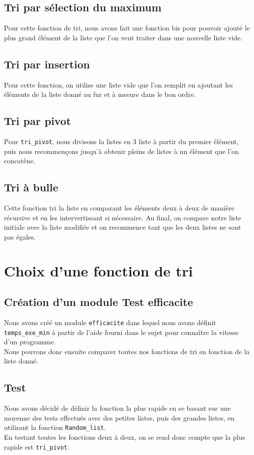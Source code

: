 \documentclass[a4paper, 11pt]{article}
\begin{document}
\subsection{Tri par sélection du maximum}
Pour cette fonction de tri, nous avons fait une fonction bis pour pouvoir ajouté le plus grand élément de la liste que l'on veut traiter dans une nouvelle liste vide.

\subsection{Tri par insertion}
Pour cette fonction, on utilise une liste vide que l'on remplit en ajoutant les éléments de la liste donné au fur et à mesure dans le bon ordre.
\subsection{Tri par pivot}
Pour \texttt{tri\_pivot}, nous divisons la listes en 3 liste à partir du premier élément, puis nous recommençons jusqu'à obtenir pleins de listes à un élément que l'on concatène.

\subsection{Tri à bulle}
Cette fonction tri la liste en comparant les éléments deux à deux de manière récursive et en les intervertissant si nécessaire.
Au final, on compare notre liste initiale avec la liste modifiée et on recommence tant que les deux listes ne sont pas égales.

\newpage
\section{Choix d'une fonction de tri}
\subsection{Création d'un module Test efficacite}
Nous avons créé un module \texttt{efficacite} dans lequel nous avons définit \texttt{temps\_exe\_min} à partir de l'aide fourni dans le sujet pour connaître la vitesse d'un programme.\\
Nous pouvons donc ensuite comparer toutes nos fonctions de tri en fonction de la liste donné.
\subsection{Test}
Nous avons décidé de définir la fonction la plus rapide en se basant sur une moyenne des tests effectués avec des petites listes, puis des grandes listes, en utilisant la fonction \texttt{Random\_list}.\\En testant toutes les fonctions deux à deux, on se rend donc compte que la plus rapide est \texttt{tri\_pivot}.
\end{document}
